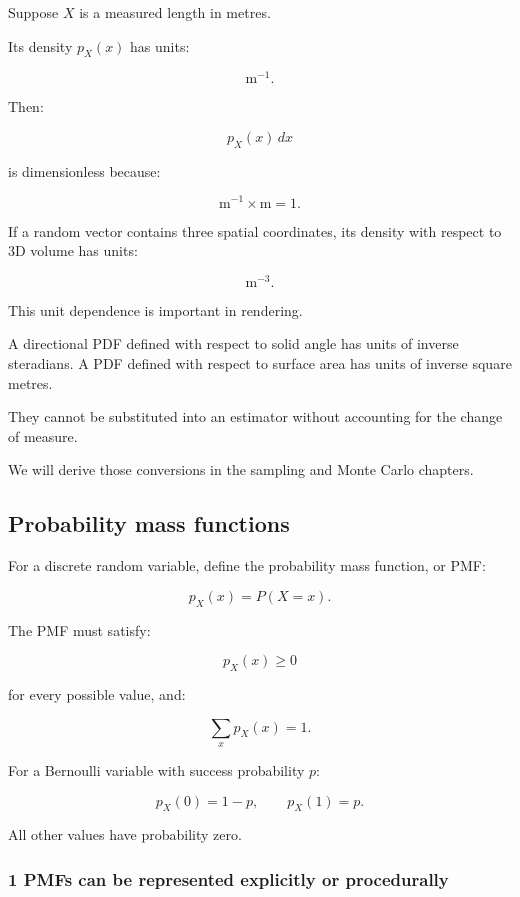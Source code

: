 Suppose \(X\) is a measured length in metres.

Its density \(p_X(x)\) has units:

\[
 \mathrm m^{-1}.
\]

Then:

\[
 p_X(x)\,dx
\]

is dimensionless because:

\[
 \mathrm m^{-1}\times\mathrm m=1.
\]

If a random vector contains three spatial coordinates, its density with respect to 3D volume has units:

\[
 \mathrm m^{-3}.
\]

This unit dependence is important in rendering.

A directional PDF defined with respect to solid angle has units of inverse steradians. A PDF defined with respect to surface area has units of inverse square metres.

They cannot be substituted into an estimator without accounting for the change of measure.

We will derive those conversions in the sampling and Monte Carlo chapters.

\subsection{Probability mass functions}\label{02-foundations-ii-ch023-probability-mass-functions}

For a discrete random variable, define the probability mass function, or PMF:

\[
 \boxed{ p_X(x)=P(X=x) }.
\]

The PMF must satisfy:

\[
 p_X(x)\ge0
\]

for every possible value, and:

\[
 \boxed{ \sum_xp_X(x)=1 }.
\]

For a Bernoulli variable with success probability \(p\):

\[
 p_X(0)=1-p, \qquad p_X(1)=p.
\]

All other values have probability zero.

\subsubsection{1 PMFs can be represented explicitly or procedurally}\label{02-foundations-ii-ch023-pmfs-can-be-represented-explicitly-or-procedurally}

